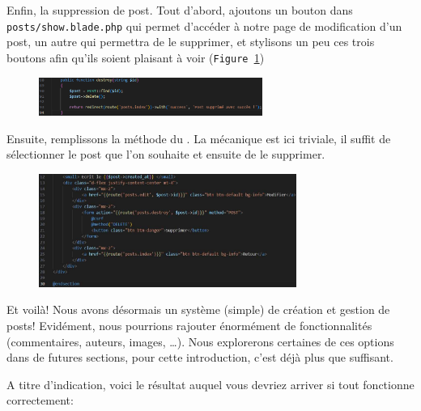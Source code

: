 \label{sec:posts_delete}

Enfin, la suppression de post. Tout d'abord, ajoutons un bouton dans \verb|posts/show.blade.php| qui permet d'accéder à notre page de modification d'un post, un autre qui permettra de le supprimer, et stylisons un peu ces trois boutons afin qu'ils soient plaisant à voir (\texttt{Figure~\ref{fig:post_delete_blade}})

\begin{figure}
    \vspace{-0.5cm}
    \includegraphics[width=0.65\textwidth]{figures-C1/post_delete_controller.pdf}
\end{figure}
Ensuite, remplissons la méthode du \controller{}. La mécanique est ici triviale, il suffit de sélectionner le post que l'on souhaite et ensuite de le supprimer.

\begin{figure}[!h]
    \centering
    \includegraphics[width=0.75\textwidth]{figures-C1/post_delete_blade.pdf}
    \caption{\label{fig:post_delete_blade}}
\end{figure}

Et voilà! Nous avons désormais un système (simple) de création et gestion de posts! Evidément, nous pourrions rajouter énormément de fonctionnalités (commentaires, auteurs, images, \ldots). Nous explorerons certaines de ces options dans de futures sections, pour cette introduction, c'est déjà plus que suffisant.

A titre d'indication, voici le résultat auquel vous devriez arriver si tout fonctionne correctement:

